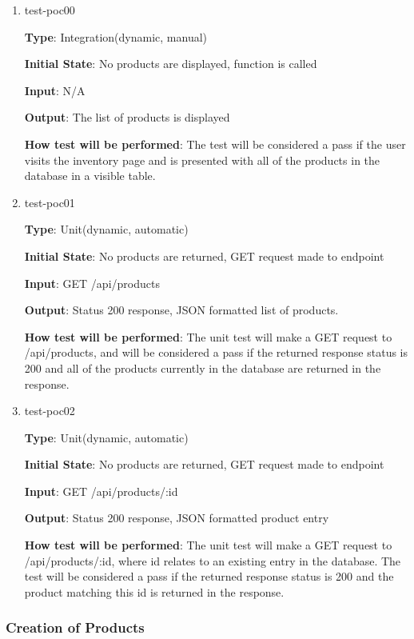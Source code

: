 \documentclass[12pt, titlepage]{article}
\begin{document}
\begin{enumerate}
\item{test-poc00\\}

\textbf{Type}: Integration(dynamic, manual)

\textbf{Initial State}: No products are displayed, function is called

\textbf{Input}: N/A

\textbf{Output}: The list of products is displayed

\textbf{How test will be performed}: The test will be considered a pass if the user visits the inventory page and is presented with all of the products in the database in a visible table.

\item{test-poc01\\}

\textbf{Type}: Unit(dynamic, automatic)

\textbf{Initial State}: No products are returned, GET request made to endpoint

\textbf{Input}: GET /api/products

\textbf{Output}: Status 200 response, JSON formatted list of products.

\textbf{How test will be performed}: The unit test will make a GET request to /api/products, and will be considered a pass if the returned response status is 200 and all of the products currently in the database are returned in the response.

\item{test-poc02\\}

\textbf{Type}: Unit(dynamic, automatic)

\textbf{Initial State}: No products are returned, GET request made to endpoint

\textbf{Input}: GET /api/products/:id

\textbf{Output}: Status 200 response, JSON formatted product entry

\textbf{How test will be performed}: The unit test will make a GET request to /api/products/:id, where id relates to an existing entry in the database. The test will be considered a pass if the returned response status is 200 and the product matching this id is returned in the response.
\end{enumerate}

\subsubsection{Creation of Products}
\end{document}
